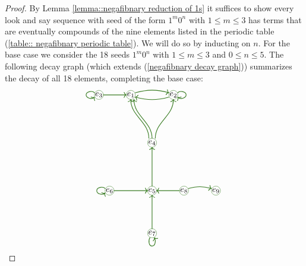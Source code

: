 \documentclass[reqno]{amsart}
\theoremstyle{definition}
\begin{document}
\begin{proof}
    By Lemma \ref{lemma::negafibnary reduction of 1s} it suffices to show every look and say sequence with seed of the form $1^m0^n$ with $1\leq m\leq 3$ has terms that are eventually compounds of the nine elements listed in the periodic table (\ref{table:: negafibnary periodic table}). We will do so by inducting on $n$. For the base case we consider the 18 seeds $1^m0^n$ with $1\leq m\leq 3$ and $0\leq n\leq 5$. The following decay graph (which extends (\ref{negafibnary decay graph})) summarizes the decay of all 18 elements, completing the base case:
    \begin{equation*}
        \begin{tikzpicture}[scale = 0.45, color=OliveGreen]
            \coordinate (1) at (-2,9); 
            \coordinate (2) at (2,9);
            \coordinate (3) at (-5,9);
            \coordinate (4) at (0,4.5);
            \coordinate (5) at (0,0);
            \coordinate (6) at (-4,0);
            \coordinate (7) at (0,-4);
            \coordinate (8) at (3,0);
            \coordinate (9) at (6,0);
            \draw[fill=white] \foreach \m in {1,...,9} {
                (\m) circle (12pt) 
                };
            \draw \foreach \m in {1,...,9} {
                node[text=black] at (\m) {$e_\m$}
            };
            \draw[->,thick] (-1.6,9.2) to[out=15, in=165] (1.6,9.2);
            \draw[<-,thick] (-1.6,8.8) to[out=-15, in=-165] (1.6,8.8);
            \draw[<-,thick] (2.4,8.8) to[out=-45, in=down] (3.2,9) to[out=up, in=45] (2.4,9.2);
            \draw[->,thick] (-4.6,9) to[out=right, in=left] (-2.4,9);
            \draw[<-,thick] (-5.4,8.8) to[out=-135, in=down] (-6.2,9) to[out=up, in=135] (-5.4,9.2);
            \draw[->,thick] (-0.3,4.9) to[out=up, in=down] (-2,8.6);
            \draw[->,thick] (0,4.9) to[out=up, in=down] (-1.7,8.6);
            \draw[->,thick] (0.3,4.9) to[out=up, in=down] (2,8.6);
            \draw[->,thick] (0,0.4) to[out=up, in=down] (0, 4.1);
            \draw[->,thick] (0,-3.6) to[out=up, in=down] (0, -0.4);
            \draw[<-,thick] (0.2,-4.4) to[out=-60, in=right] (0,-5.2) to[out=left, in=-120] (-0.2,-4.4);
            \draw[->,thick] (-3.6,0) to[out=right, in=left] (-0.4,0);
            \draw[<-,thick] (-4.4,-0.2) to[out=-135, in=down] (-5.2,0) to[out=up, in=135] (-4.4,0.2);
            \draw[<-,thick] (0.4,0) to[out=right, in=left] (2.6,0);
            \draw[->,thick] (3.4,0.2) to[out=15, in=165] (5.6,0.2);

\end{tikzpicture}
\end{equation*}
\end{proof}
\end{document}
